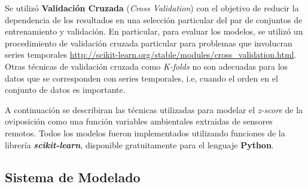   \par Se utilizó \textbf{Validación Cruzada}
    (\textit{Cross Validation}) \cite{cross_validation, ml_rainfall} con el
    objetivo de reducir la dependencia de los resultados en una selección particular
    del par de conjuntos de entrenamiento y validación. En particular, para
    evaluar los modelos, se utilizó un procedimiento de validación cruzada
    particular para problemas que involucran series temporales
    \url{http://scikit-learn.org/stable/modules/cross_validation.html}.
    Otras técnicas de validación cruzada como \textit{K-folds} no son
    adecuadas para los datos que se corresponden con series temporales, i.e,
    cuando el orden en el conjunto de datos es importante.

    \par A continuación se describiran las técnicas utilizadas para modelar
    el \textit{z-score} de la oviposición como una función variables ambientales
    extraidas de sensores remotos. Todos los modelos fueron implementados utilizando
    funciones de la librería \textbf{\textit{scikit-learn}}, disponible
    gratuitamente para el lenguaje \textbf{Python}.


    \subsection{Sistema de Modelado}

